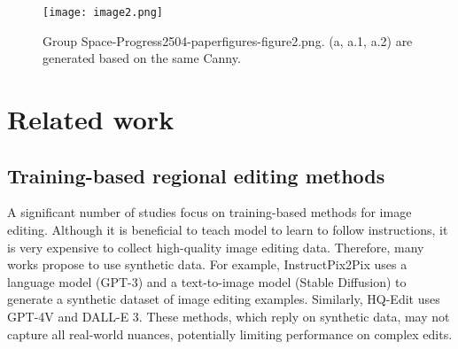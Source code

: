 \documentclass{article}
\begin{document}
















\begin{figure}[t]
    \centering
    \texttt{[image: image2.png]}
    \caption{Group Space-Progress2504-paperfigures-figure2.png. (a, a.1, a.2) are generated based on the same Canny.}
    \label{fig2}
\end{figure}


\section{Related work}
\subsection{Training-based regional editing methods}

A significant number of studies focus on training-based methods for image editing. Although it is beneficial to teach model to learn to follow instructions, it is very expensive to collect high-quality image editing data. Therefore, many works propose to use synthetic data. For example, InstructPix2Pix \citep{brooks2023instructpix2pix} uses a language model (GPT-3) and a text-to-image model (Stable Diffusion) to generate a synthetic dataset of image editing examples. Similarly, HQ-Edit \citep{hui2024hq} uses GPT-4V and DALL-E 3. These methods, which reply on synthetic data, may not capture all real-world nuances, potentially limiting performance on complex edits.
\end{document}
